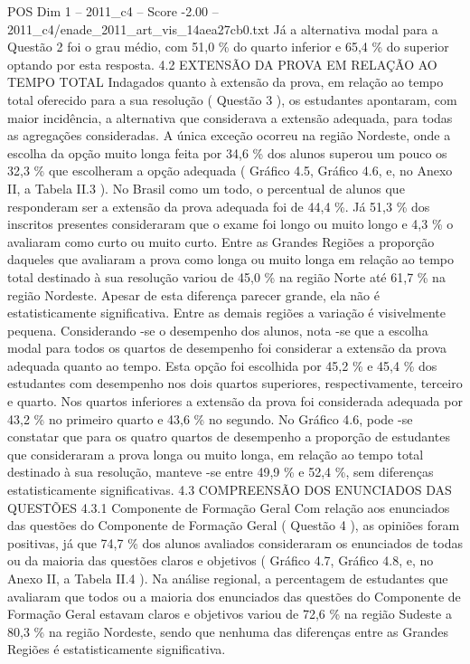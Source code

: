 \begin{textsample}{POS Dim 1 – 2011\_c4 – Score -2.00 – 2011\_c4/enade\_2011\_art\_vis\_14aea27cb0.txt}
Já a alternativa modal para a Questão 2 foi o grau médio, com 51,0 \% do quarto inferior e 65,4 \% do superior optando por esta resposta. 4.2 EXTENSÃO DA PROVA EM RELAÇÃO AO TEMPO TOTAL Indagados quanto à extensão da prova, em relação ao tempo total oferecido para a sua resolução ( Questão 3 ), os estudantes apontaram, com maior incidência, a alternativa que considerava a extensão adequada, para todas as agregações consideradas.
A única exceção ocorreu na região Nordeste, onde a escolha da opção muito longa feita por 34,6 \% dos alunos superou um pouco os 32,3 \% que escolheram a opção adequada ( Gráfico 4.5, Gráfico 4.6, e, no Anexo II, a Tabela II.3 ).
No Brasil como um todo, o percentual de alunos que responderam ser a extensão da prova adequada foi de 44,4 \%.
Já 51,3 \% dos inscritos presentes consideraram que o exame foi longo ou muito longo e 4,3 \% o avaliaram como curto ou muito curto.
Entre as Grandes Regiões a proporção daqueles que avaliaram a prova como longa ou muito longa em relação ao tempo total destinado à sua resolução variou de 45,0 \% na região Norte até 61,7 \% na região Nordeste.
Apesar de esta diferença parecer grande, ela não é estatisticamente significativa.
Entre as demais regiões a variação é visivelmente pequena.
Considerando -se o desempenho dos alunos, nota -se que a escolha modal para todos os quartos de desempenho foi considerar a extensão da prova adequada quanto ao tempo.
Esta opção foi escolhida por 45,2 \% e 45,4 \% dos estudantes com desempenho nos dois quartos superiores, respectivamente, terceiro e quarto.
Nos quartos inferiores a extensão da prova foi considerada adequada por 43,2 \% no primeiro quarto e 43,6 \% no segundo.
No Gráfico 4.6, pode -se constatar que para os quatro quartos de desempenho a proporção de estudantes que consideraram a prova longa ou muito longa, em relação ao tempo total destinado à sua resolução, manteve -se entre 49,9 \% e 52,4 \%, sem diferenças estatisticamente significativas. 4.3 COMPREENSÃO DOS ENUNCIADOS DAS QUESTÕES 4.3.1 Componente de Formação Geral Com relação aos enunciados das questões do Componente de Formação Geral ( Questão 4 ), as opiniões foram positivas, já que 74,7 \% dos alunos avaliados consideraram os enunciados de todas ou da maioria das questões claros e objetivos ( Gráfico 4.7, Gráfico 4.8, e, no Anexo II, a Tabela II.4 ).
Na análise regional, a percentagem de estudantes que avaliaram que todos ou a maioria dos enunciados das questões do Componente de Formação Geral estavam claros e objetivos variou de 72,6 \% na região Sudeste a 80,3 \% na região Nordeste, sendo que nenhuma das diferenças entre as Grandes Regiões é estatisticamente significativa.

\end{textsample}
